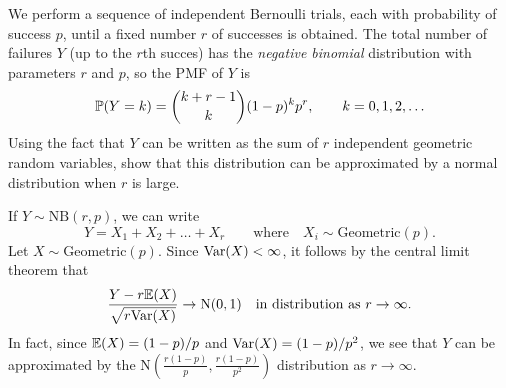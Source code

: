 \begin{exercise}
\begin{questions}
\question
We perform a sequence of independent Bernoulli trials, each with probability of success $p$, until a fixed number $r$ of successes is obtained. The total number of failures $Y$ (up to the $r$th succes) has the \emph{negative binomial} distribution with parameters $r$ and $p$, so the PMF of $Y$ is
\[
\mathbb{P}(Y=k) = \binom{k+r-1}{k} (1-p)^k p^r,\qquad k=0,1,2,\ldots
\]
Using the fact that $Y$ can be written as the sum of $r$ independent geometric random variables, show that this distribution can be approximated by a normal distribution when $r$ is large.

\begin{answer}
If $Y\sim\text{NB}(r,p)$, we can write
\[
Y = X_1 + X_2 + \ldots + X_r\qquad\text{where}\quad X_i\sim\text{Geometric}(p).
\]
Let $X\sim\text{Geometric}(p)$. Since $\text{Var}(X)<\infty$, it follows by the central limit theorem that 
\[
\frac{Y - r\mathbb{E}(X)}{\sqrt{r\text{Var}(X)}} \to \text{N}(0,1) \quad\text{in distribution as }r\to\infty.
\]
In fact, since $\mathbb{E}(X)=(1-p)/p$ and $\text{Var}(X)=(1-p)/p^2$, we see that $Y$ can be approximated by the 
$\displaystyle\text{N}\left(\frac{r(1-p)}{p}, \frac{r(1-p)}{p^2}\right)$ distribution as $r\to\infty$.
\end{answer}

\end{questions}
\end{exercise}

